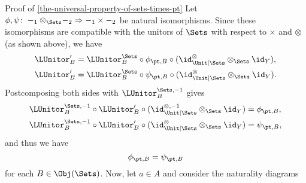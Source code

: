 \begin{Proof}{Proof of \cref{the-universal-property-of-sets-times-pt}}
    Let $\phi,\psi\colon-_{1}\otimes_{\Sets}-_{2}\Rightarrow-_{1}\times-_{2}$ be natural isomorphisms. Since these isomorphisms are compatible with the unitors of $\Sets$ with respect to $\times$ and $\otimes$ (as shown above), we have
    \begin{align*}
        \LUnitor'_{B} &= \LUnitor^{\Sets}_{B}\circ\phi_{\pt,B}\circ(\id^{\otimes}_{\Unit|\Sets}\otimes_{\Sets}\id_{Y}),\\
        \LUnitor'_{B} &= \LUnitor^{\Sets}_{B}\circ\psi_{\pt,B}\circ(\id^{\otimes}_{\Unit|\Sets}\otimes_{\Sets}\id_{Y}).
    \end{align*}
    Postcomposing both sides with $\LUnitor^{\Sets,-1}_{B}$ gives
    \begin{align*}
        \LUnitor^{\Sets,-1}_{B}\circ\LUnitor'_{B}\circ(\id^{\otimes,-1}_{\Unit|\Sets}\otimes_{\Sets}\id_{Y}) &= \phi_{\pt,B},\\
        \LUnitor^{\Sets,-1}_{B}\circ\LUnitor'_{B}\circ(\id^{\otimes}_{\Unit|\Sets}\otimes_{\Sets}\id_{Y})    &= \psi_{\pt,B},
    \end{align*}
    and thus we have
    \[
        \phi_{\pt,B}%
        =%
        \psi_{\pt,B}%
    \]%
    for each $B\in\Obj(\Sets)$. Now, let $a\in A$ and consider the naturality diagrams
    \begin{webcompile}
        \quad
\end{webcompile}
\end{Proof}

